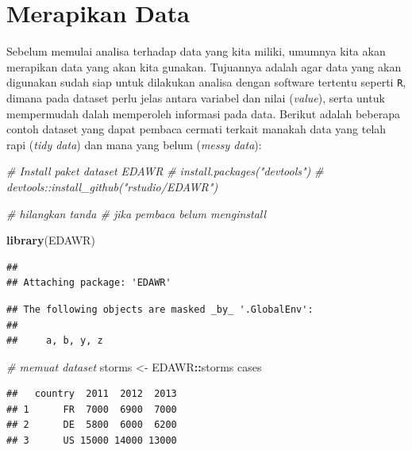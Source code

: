 \documentclass[]{book}
\newenvironment{Shaded}{\begin{snugshade}}{\end{snugshade}}
\newcommand{\KeywordTok}[1]{\textcolor[rgb]{0.13,0.29,0.53}{\textbf{#1}}}
\newcommand{\StringTok}[1]{\textcolor[rgb]{0.31,0.60,0.02}{#1}}
\newcommand{\CommentTok}[1]{\textcolor[rgb]{0.56,0.35,0.01}{\textit{#1}}}
\newcommand{\OperatorTok}[1]{\textcolor[rgb]{0.81,0.36,0.00}{\textbf{#1}}}
\newcommand{\NormalTok}[1]{#1}
\begin{document}
\section{Merapikan Data}\label{merapikan-data}

Sebelum memulai analisa terhadap data yang kita miliki, umumnya kita
akan merapikan data yang akan kita gunakan. Tujuannya adalah agar data
yang akan digunakan sudah siap untuk dilakukan analisa dengan software
tertentu seperti \texttt{R}, dimana pada dataset perlu jelas antara
variabel dan nilai (\emph{value}), serta untuk mempermudah dalah
memperoleh informasi pada data. Berikut adalah beberapa contoh dataset
yang dapat pembaca cermati terkait manakah data yang telah rapi
(\emph{tidy data}) dan mana yang belum (\emph{messy data}):

\begin{Shaded}
\begin{Highlighting}[]
\CommentTok{# Install paket dataset EDAWR}
\CommentTok{# install.packages("devtools")}
\CommentTok{# devtools::install_github("rstudio/EDAWR")}

\CommentTok{# hilangkan tanda # jika pembaca belum menginstall}
\end{Highlighting}
\end{Shaded}

\begin{Shaded}
\begin{Highlighting}[]
\KeywordTok{library}\NormalTok{(EDAWR)}
\end{Highlighting}
\end{Shaded}

\begin{verbatim}
## 
## Attaching package: 'EDAWR'
\end{verbatim}

\begin{verbatim}
## The following objects are masked _by_ '.GlobalEnv':
## 
##     a, b, y, z
\end{verbatim}

\begin{Shaded}
\begin{Highlighting}[]
\CommentTok{# memuat dataset}
\NormalTok{storms <-}\StringTok{ }\NormalTok{EDAWR}\OperatorTok{::}\NormalTok{storms}
\NormalTok{cases}
\end{Highlighting}
\end{Shaded}

\begin{verbatim}
##   country  2011  2012  2013
## 1      FR  7000  6900  7000
## 2      DE  5800  6000  6200
## 3      US 15000 14000 13000
\end{verbatim}
\end{document}
